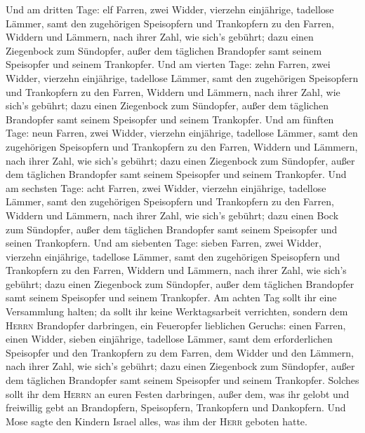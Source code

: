 Und am dritten Tage: elf Farren, zwei Widder, vierzehn einjährige,
tadellose Lämmer,  samt den zugehörigen Speisopfern und
Trankopfern zu den Farren, Widdern und Lämmern, nach ihrer Zahl, wie
sich's gebührt;  dazu einen Ziegenbock zum Sündopfer,
außer dem täglichen Brandopfer samt seinem Speisopfer und seinem
Trankopfer.  Und am vierten Tage: zehn Farren, zwei
Widder,  vierzehn einjährige, tadellose Lämmer, samt den
zugehörigen Speisopfern und Trankopfern zu den Farren, Widdern und
Lämmern, nach ihrer Zahl, wie sich's gebührt;  dazu einen
Ziegenbock zum Sündopfer, außer dem täglichen Brandopfer samt seinem
Speisopfer und seinem Trankopfer.  Und am fünften Tage:
neun Farren, zwei Widder, vierzehn einjährige, tadellose Lämmer,
 samt den zugehörigen Speisopfern und Trankopfern zu den
Farren, Widdern und Lämmern, nach ihrer Zahl, wie sich's gebührt;
 dazu einen Ziegenbock zum Sündopfer, außer dem täglichen
Brandopfer samt seinem Speisopfer und seinem Trankopfer. 
Und am sechsten Tage: acht Farren, zwei Widder, vierzehn einjährige,
tadellose Lämmer,  samt den zugehörigen Speisopfern und
Trankopfern zu den Farren, Widdern und Lämmern, nach ihrer Zahl, wie
sich's gebührt;  dazu einen Bock zum Sündopfer, außer dem
täglichen Brandopfer samt seinem Speisopfer und seinen Trankopfern.
 Und am siebenten Tage: sieben Farren, zwei Widder,
vierzehn einjährige, tadellose Lämmer,  samt den
zugehörigen Speisopfern und Trankopfern zu den Farren, Widdern und
Lämmern, nach ihrer Zahl, wie sich's gebührt;  dazu einen
Ziegenbock zum Sündopfer, außer dem täglichen Brandopfer samt seinem
Speisopfer und seinem Trankopfer.  Am achten Tag sollt
ihr eine Versammlung halten; da sollt ihr keine Werktagsarbeit
verrichten,  sondern dem \textsc{Herrn} Brandopfer
darbringen, ein Feueropfer lieblichen Geruchs: einen Farren, einen
Widder, sieben einjährige, tadellose Lämmer,  samt dem
erforderlichen Speisopfer und den Trankopfern zu dem Farren, dem Widder
und den Lämmern, nach ihrer Zahl, wie sich's gebührt; 
dazu einen Ziegenbock zum Sündopfer, außer dem täglichen Brandopfer samt
seinem Speisopfer und seinem Trankopfer.  Solches sollt
ihr dem \textsc{Herrn} an euren Festen darbringen, außer dem, was ihr
gelobt und freiwillig gebt an Brandopfern, Speisopfern, Trankopfern und
Dankopfern.  Und Mose sagte den Kindern Israel alles, was
ihm der \textsc{Herr} geboten hatte.

